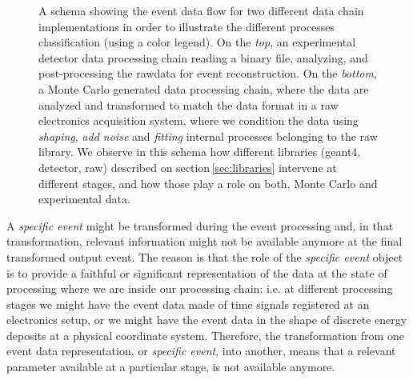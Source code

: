 \begin{figure}[tb]
  \centering
	\caption{A schema showing the event data flow for two different data chain implementations in order to illustrate the different processes classification (using a color legend). On the \emph{top}, an experimental detector data processing chain reading a binary file, analyzing, and post-processing the rawdata for event reconstruction. On the \emph{bottom}, a Monte Carlo generated data processing chain, where the data are analyzed and transformed to match the data format in a raw electronics acquisition system, where we condition the data using \emph{shaping}, \emph{add noise} and \emph{fitting} internal processes belonging to the raw library. We observe in this schema how different libraries (geant4, detector, raw) described on section\,\ref{sec:libraries} intervene at different stages, and how those play a role on both, Monte Carlo and experimental data.}  \label{fig:dataChain}
\end{figure}

A \emph{specific event} might be transformed during the event processing and, in that transformation, relevant information might not be available anymore at the final transformed output event. The reason is that the role of the \emph{specific event} object is to provide a faithful or significant representation of the data at the state of processing where we are inside our processing chain: i.e. at different processing stages we might have the event data made of time signals registered at an electronics setup, or we might have the event data in the shape of discrete energy deposits at a physical coordinate system. Therefore, the transformation from one event data representation, or \emph{specific event}, into another, means that a relevant parameter available at a particular stage, is not available anymore.

